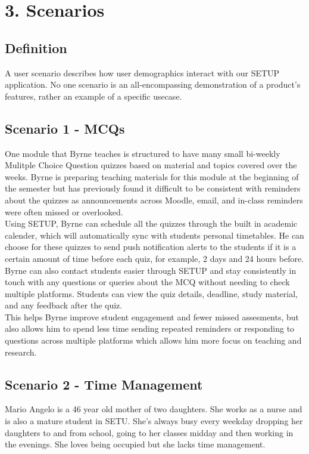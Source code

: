 \section*{3. Scenarios}

\subsection*{Definition}
A user scenario describes how user demographics interact with our SETUP application. No one scenario is an all-encompassing demonstration of a product's features, rather an example of a specific usecase.
\subsection*{Scenario 1 - MCQs}
One module that Byrne teaches is structured to have many small bi-weekly Mulitple Choice Question quizzes based on material and topics covered over the weeks. Byrne is preparing teaching materials for this module at the beginning of the semester but has previously found it difficult to be consistent with reminders about the quizzes as announcements across Moodle, email, and in-class reminders were often missed or overlooked.\\

Using SETUP, Byrne can schedule all the quizzes through the built in academic calender, which will automatically sync with students personal timetables. He can choose for these quizzes to send push notification alerts to the students if it is a certain amount of time before each quiz, for example, 2 days and 24 hours before.\\

Byrne can also contact students easier through SETUP and stay consistently in touch with any questions or queries about the MCQ without needing to check multiple platforms. Students can view the quiz details, deadline, study material, and any feedback after the quiz. \\

This helps Byrne improve student engagement and fewer missed assesments, but also allows him to spend less time sending repeated reminders or responding to questions across multiple platforms which allows him more focus on teaching and research.\\


\subsection*{Scenario 2 - Time Management}
Mario Angelo is a 46 year old mother of two daughters. She works as a nurse and is also a mature student in SETU. She's always busy every weekday dropping her daughters to and from school, going to her classes midday and then working in the evenings. She loves being occupied but she lacks time management.\\

